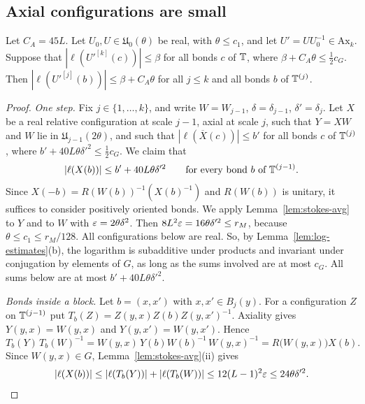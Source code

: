 \subsection{Axial configurations are small}\label{ss:24.3}

\begin{lemma}\label{lem:axial-small}
Let $C_A=45L$. Let $U_0,U\in\mathfrak U_0(\theta)$ be real, with $\theta\le c_1$, and let $U'=UU_0^{-1}\in\mathrm{Ax}_k$. Suppose that $|\ell(U'^{[k]}(c))|\le\beta$ for all bonds $c$ of $\mathbb T$, where $\beta+C_A\theta\le\frac12c_G$. Then $|\ell(U'^{[j]}(b))|\le\beta+C_A\theta$ for all $j\le k$ and all bonds $b$ of $\mathbb T^{(j)}$.
\end{lemma}

\begin{proof}
\emph{One step.} Fix $j\in\{1,\dots,k\}$, and write $W=W_{j-1}$, $\delta=\delta_{j-1}$, $\delta'=\delta_j$. Let $X$ be a real relative configuration at scale $j-1$, axial at scale $j$, such that $Y=XW$ and $W$ lie in $\mathfrak U_{j-1}(2\theta)$, and such that $|\ell(\overline X(c))|\le b'$ for all bonds $c$ of $\mathbb T^{(j)}$, where $b'+40L\theta\delta'^2\le\frac12c_G$. We claim that
\[
|\ell(X(b))|\le b'+40L\theta\delta'^2\qquad\text{for every bond $b$ of $\mathbb T^{(j-1)}$.}
\]
Since $X(-b)=R(W(b))^{-1}(X(b)^{-1})$ and $R(W(b))$ is unitary, it suffices to consider positively oriented bonds. We apply Lemma~\ref{lem:stokes-avg} to $Y$ and to $W$ with $\varepsilon=2\theta\delta^2$. Then $8L^2\varepsilon=16\theta\delta'^2\le r_M$, because $\theta\le c_1\le r_M/128$. All configurations below are real. So, by Lemma~\ref{lem:log-estimates}(b), the logarithm is subadditive under products and invariant under conjugation by elements of $G$, as long as the sums involved are at most $c_G$. All sums below are at most $b'+40L\theta\delta'^2$.

\emph{Bonds inside a block.} Let $b=(x,x')$ with $x,x'\in B_j(y)$. For a configuration $Z$ on $\mathbb T^{(j-1)}$ put $T_b(Z)=Z(y,x)Z(b)Z(y,x')^{-1}$. Axiality gives $Y(y,x)=W(y,x)$ and $Y(y,x')=W(y,x')$. Hence
\[
T_b(Y)\,T_b(W)^{-1}=W(y,x)\,Y(b)W(b)^{-1}\,W(y,x)^{-1}=R\big(W(y,x)\big)X(b).
\]
Since $W(y,x)\in G$, Lemma~\ref{lem:stokes-avg}(ii) gives
\[
|\ell(X(b))|\le|\ell(T_b(Y))|+|\ell(T_b(W))|\le12(L-1)^2\varepsilon\le24\theta\delta'^2 .
\]


\end{proof}
